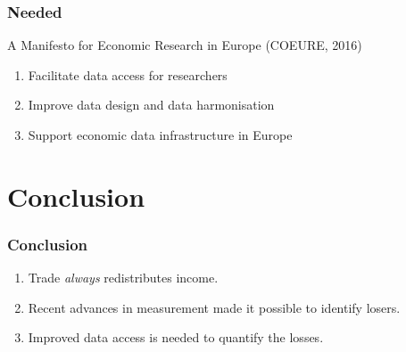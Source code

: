 \documentclass[aspectratio=169,compress,mathserif]{beamer}
\begin{document}
\begin{frame}\frametitle{Needed}\hypertarget{Needed}{}
\begin{block}{A Manifesto for Economic Research in Europe (COEURE, 2016)}\hypertarget{A Manifesto for Economic Research in Europe (COEURE, 2016)}{}
\begin{enumerate}\setcounter{enumi}{0}
\item Facilitate data access for researchers

\item Improve data design and data harmonisation

\item Support economic data infrastructure in Europe


\end{enumerate}
\end{block}
\end{frame}







\section{Conclusion}\hypertarget{Conclusion}{}
\begin{frame}\frametitle{Conclusion}\hypertarget{Conclusion}{}
\begin{enumerate}\setcounter{enumi}{0}
\item Trade \emph{always} redistributes income.

\item Recent advances in measurement made it possible to identify losers.

\item Improved data access is needed to quantify the losses.
\end{enumerate}
\end{frame}
\end{document}
